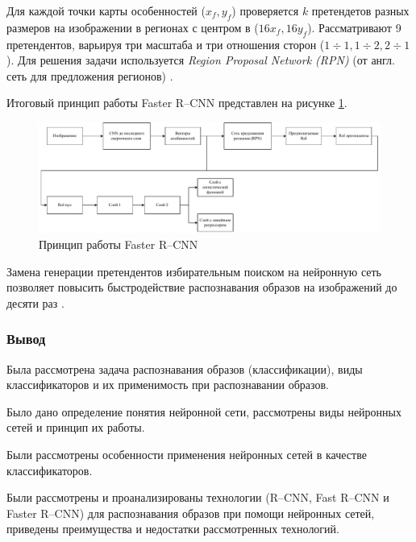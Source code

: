 Для каждой точки карты особенностей ($x_f, y_f$) проверяется $k$ претендетов разных размеров на изображении в регионах с центром в ($16x_f, 16y_f$). Рассматривают 9 претендентов, варьируя три масштаба и три отношения сторон ($1\div1, 1\div2, 2\div1$). Для решения задачи используется \textit{Region Proposal Network (RPN)} (от англ. сеть для предложения регионов) \cite{rpn}.

Итоговый принцип работы Faster R--CNN представлен на рисунке \ref{fig:fasterrcnn}.

\begin{figure}[H]
	\centering
	\includegraphics[width=\textwidth]{img/fasterrcnn.pdf}
	\caption{Принцип работы Faster R--CNN}
	\label{fig:fasterrcnn}
\end{figure}

Замена генерации претендентов избирательным поиском на нейронную сеть позволяет повысить быстродействие распознавания образов на изображений до десяти раз \cite{fasterrcnn}.

\subsubsection*{Вывод}
Была рассмотрена задача распознавания образов (классификации), виды классификаторов и их применимость при распознавании образов.

Было дано определение понятия нейронной сети, рассмотрены виды нейронных сетей и принцип их работы.

Были рассмотрены особенности применения нейронных сетей в качестве классификаторов.

Были рассмотрены и проанализированы технологии (R--CNN, Fast R--CNN и Faster R--CNN) для распознавания образов при помощи нейронных сетей, приведены преимущества и недостатки рассмотренных технологий.